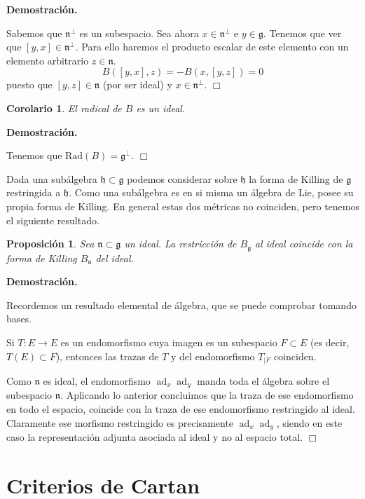 \documentclass[a4paper,draft,12pt]{scrartcl}
\newtheorem{propo}[teo]{Proposición}%
\newtheorem{cor}[teo]{Corolario}%
\newcommand{\dem}{\noindent \textbf{Demostración. }\vspace{0.3 cm}}%
\newcommand{\g}{\mathfrak{g}}%
\newcommand{\fin}{ $\Box $ \vspace{0.4 cm}}
\DeclareMathOperator{\ad}{ad}  %
\begin{document}
\dem


Sabemos que $\mathfrak{n}^\perp$ es un subespacio.  Sea ahora $x \in \mathfrak{n}^\perp$ e $y \in \g$.  Tenemos que ver que $[y,x] \in \mathfrak{n}^\perp$.  Para ello haremos el producto escalar de este elemento con un elemento arbitrario $z \in \mathfrak{n}$.
$$
B([y,x],z)= -B(x,[y,z])=0
$$
puesto que $[y,z] \in \mathfrak{n}$ (por ser ideal) y $x \in \mathfrak{n}^\perp$. \fin

\begin{cor}

El radical de $B$ es un ideal.

\end{cor}

\dem

Tenemos que $\textrm{Rad}(B)= \g^\perp$.  \fin


Dada una subálgebra $\mathfrak{h} \subset \g$ podemos considerar sobre $\mathfrak{h}$ la forma de Killing de $\g$ restringida a $\mathfrak{h}$.  Como una subálgebra es en si misma un álgebra de Lie, posee su propia forma de Killing.  En general estas dos métricas no coinciden, pero tenemos el siguiente resultado.

\begin{propo}

Sea $\mathfrak{n}\subset \g$ un ideal.  La restricción de $B_\g$ al ideal coincide con la forma de Killing $B_\mathfrak{n}$ del ideal.

\end{propo}

\dem

Recordemos un resultado elemental de álgebra, que se puede comprobar tomando bases.

Si $T:E \rightarrow E$ es un endomorfismo cuya imagen es un subespacio $F \subset E$ (es decir, $T(E) \subset F$), entonces las trazas de $T$ y del endomorfismo $T_{\mid F}$ coinciden.

Como $\mathfrak{n}$ es ideal, el endomorfismo $\ad_x\ad_y$ manda toda el álgebra sobre el subespacio $\mathfrak{n}$.  Aplicando lo anterior concluimos que la traza de ese endomorfismo en todo el espacio, coincide con la traza de ese endomorfismo restringido al ideal.  Claramente ese morfismo restringido es precisamente $\ad_x\ad_y$, siendo en este caso la representación adjunta asociada al ideal y no al espacio total.  \fin

\newpage
 
 \section{Criterios de Cartan}
 
\end{document}
